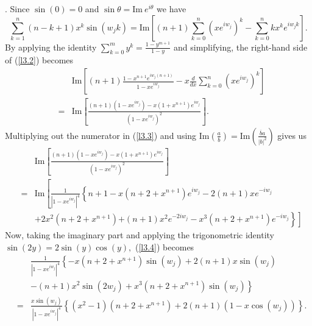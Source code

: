 \documentclass[final]{siamltex}
\begin{document}
. Since $\sin(0) = 0$  and $\sin \theta = \mbox{Im}\  e^{i \theta}$ we have  
 \begin{equation} 
\label{l3.2}
\sum_{k=1}^{n}(n-k+1)x^{k}\sin(w_{j}k)  =  \mbox{Im} \left[ (n+1)\sum_{k=0}^{n} \left( xe^{iw_{j}} \right)^{k} - \sum_{k=0}^{n}kx^{k}e^{iw_{j}k} \right]. 
 \end{equation}  
  By applying the identity $\sum_{k=0}^{m} y^{k} = \frac{1-y^{m+1}}{1-y}$ and simplifying, the right-hand side of (\ref{l3.2}) becomes
 \begin{eqnarray}
 &  &  \mbox{Im} \left[ (n+1) \frac{1 - x^{n+1}e^{iw_{j}(n+1)}}{1-xe^{iw_{j}}} - x \frac{d}{dx} \sum_{k=0}^{n} \left( xe^{iw_{j}} \right)^{k} \right] \nonumber \\
\label{l3.3} 
& = &  \mbox{Im} \left[ \frac{ (n+1)(1-xe^{iw_{j}})-x(1+x^{n+1})e^{iw_{j}} }{ (1-xe^{iw_{j}})^{2} } \right]. 
 \end{eqnarray}
  Multiplying out the numerator in (\ref{l3.3}) and using $\mbox{Im} \left(\frac{a}{b} \right) = \mbox{Im}  \left( \frac{ \overline{b} a}{ |b|^{2}} \right)$ gives us 
  \begin{eqnarray}
 \label{l3.4} 
&  & \mbox{Im} \left[ \frac{ (n+1)(1-xe^{iw_{j}})-x(1+x^{n+1})e^{iw_{j}} }{ (1-xe^{iw_{j}})^{2} } \right] \nonumber \\
& = & \mbox{Im} \left[ \frac{1}{ \left| 1-xe^{iw_{j}} \right| ^{4} } \left\{ n+1 - x(n+2+x^{n+1})e^{iw_{j}} - 2(n+1)xe^{-iw_{j}} \right. \right. \nonumber \\ & & + 2x^{2}(n+2+x^{n+1})  \left. \left. + (n+1)x^{2}e^{-2iw_{j}} - x^{3}(n+2+x^{n+1})e^{-iw_{j}} \right\} \right] 
 \end{eqnarray} 
  Now, taking the imaginary part and applying the trigonometric identity $\sin(2y) = 2 \sin(y) \cos(y),$ (\ref{l3.4}) becomes
 \begin{eqnarray*}
 &  & \frac{1}{ \left| 1-xe^{iw_{j}} \right| ^{4} } \left\{-x(n+2+x^{n+1})\sin(w_{j}) + 2(n+1)x\sin(w_{j})
 \right. \\ & & \left. - (n+1)x^{2}\sin(2w_{j}) + x^{3}(n+2+x^{n+1})\sin(w_{j}) \right\} \\
& = & \frac{ x\sin(w_{j}) }{\left| 1-xe^{iw_{j}} \right| ^{4} } \left\{ (x^{2}-1)(n+2+x^{n+1}) + 2(n+1)(1-x\cos(w_{j})) \right\}. 
 \end{eqnarray*} 

\vspace {4 pt}
\end{document}
